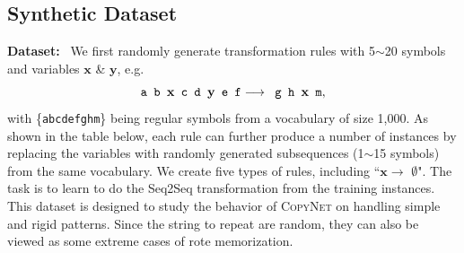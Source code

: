 \subsection{Synthetic Dataset}
\label{section: synthetic}
\textbf{Dataset:}~  
We first randomly generate transformation rules with 5$\sim$20 symbols and variables $\mathbf{x}$ \& $\mathbf{y}$, e.g.  \vspace{-7pt} 
\[
\texttt{a b } \mathbf{x} \texttt{ c d }\mathbf{y} \texttt{ e f} \longrightarrow \texttt{ g h }\mathbf{x}\texttt{ m},  
\vspace{-5pt}
\]
with \{\texttt{a\;b\;c\;d\;e\;f\;g\;h\;m}\} being regular symbols from a vocabulary of size 1,000. As shown in the table below, each rule can further produce a number of instances by replacing the variables with randomly generated subsequences (1$\sim$15 symbols) from the same vocabulary. We create five types of rules, including ``$\mathbf{x}\rightarrow$ $\emptyset$".
The task is to learn to do the Seq2Seq transformation from the training instances. 
This dataset is designed to study the behavior of \textsc{CopyNet} on handling simple and rigid patterns. Since the string to repeat are random, they can also be viewed as some extreme cases of rote memorization.   
